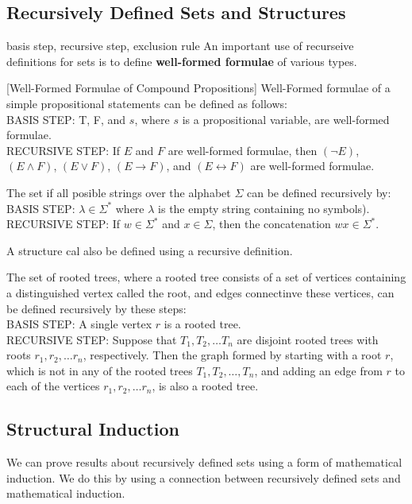   \subsection {Recursively Defined Sets and Structures}
basis step, recursive step, exclusion rule
An important use of recurseive definitions for sets is to define \textbf{well-formed formulae} of various types.

\begin{definition} \label{WFF} [Well-Formed Formulae of Compound Propositions]  Well-Formed formulae of a simple propositional statements can be defined as follows:\\
BASIS STEP: T, F, and $s$, where $s$ is a propositional variable, are well-formed formulae.\\
RECURSIVE STEP: If $E$ and $F$ are well-formed formulae, then $(\neg E)$, $(E \land F)$, $(E \lor F)$, $(E \rightarrow F)$, and $(E \leftrightarrow F)$ are well-formed formulae.
\end{definition}

\begin{definition}[$\Sigma^*$]
The set if all posible strings over the alphabet $\Sigma$ can be defined recursively by:\\
BASIS STEP: $\lambda \in \Sigma^*$ where $\lambda$
 is the empty string containing no symbols).\\
RECURSIVE STEP: If $w \in \Sigma^*$ and $x \in \Sigma$, then the concatenation $wx \in \Sigma^*$.
\end{definition}

A structure cal also be defined using a recursive definition.

\begin{definition}
The set of rooted trees, where a rooted tree consists of a set of vertices containing a distinguished vertex called the root, and edges connectinve these vertices, can be defined recursively by these steps:\\
BASIS STEP: A single vertex $r$ is a rooted tree. \\
RECURSIVE STEP: Suppose that $T_1,T_2, \dots T_n$ are disjoint rooted trees with roots $r_1,r_2, \dots r_n$, respectively. Then the graph formed by starting with a root $r$, which is not in any of the rooted trees $T_1,T_2, \dots,T_n$, and adding an edge from $r$ to each of the vertices $r_1,r_2, \dots r_n$, is also a rooted tree.
\end{definition}

  \subsection {Structural Induction}
We can prove results about recursively defined sets using a form of mathematical induction. We do this by using a connection between recursively defined sets and mathematical induction.

